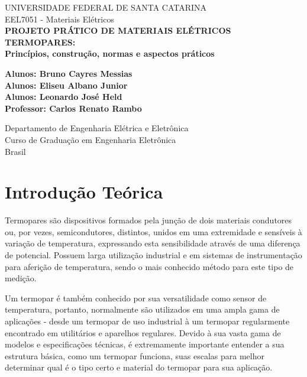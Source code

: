 \documentclass[a4paper,12pt]{report}
\begin{document}
	
	\begin{titlepage}
		\begin{center}
			
			\Large
			UNIVERSIDADE FEDERAL DE SANTA CATARINA\\
			EEL7051 - Materiais Elétricos\\
			\vspace*{5cm}
			\Huge
			\textbf{PROJETO PRÁTICO DE MATERIAIS ELÉTRICOS}\\
			\textbf{TERMOPARES:}\\
			\textbf{Princípios, construção, normas e aspectos práticos}
			
			\vspace{1.5cm}
			
			\vfill
			\Large
			\textbf{Alunos: Bruno Cayres Messias}\\
			\textbf{Alunos: Eliseu Albano Junior}\\
			\textbf{Alunos: Leonardo José Held}\\
			
			\textbf{Professor: Carlos Renato Rambo} %
			\vspace{0.8cm}
			
			Departamento de Engenharia Elétrica e Eletrônica\\
			Curso de Graduação em Engenharia Eletrônica\\
			Brasil\\
			
			
			
		\end{center}
	\end{titlepage}
	\Large
	
	\pagebreak
	\listoffigures
    \pagebreak
    \tableofcontents
	
	\chapter{Introdução Teórica}
	
	Termopares são dispositivos formados pela junção de dois materiais condutores ou, por vezes, semicondutores, distintos, unidos em uma extremidade e sensíveis à variação de temperatura, expressando esta sensibilidade através de uma diferença de potencial. Possuem larga utilização industrial e em sistemas de instrumentação para aferição de temperatura, sendo o mais conhecido método para este tipo de medição.
	
	\noindent Um termopar é também conhecido por sua versatilidade como sensor de temperatura, portanto, normalmente são utilizados em uma ampla gama de aplicações - desde um termopar de uso industrial à um termopar regularmente encontrado em utilitários e aparelhos regulares. Devido à sua vasta gama de modelos e especificações técnicas, é extremamente importante entender a sua estrutura básica, como um termopar funciona, suas escalas para melhor determinar qual é o tipo certo e material do termopar para sua aplicação.
	
\end{document}
